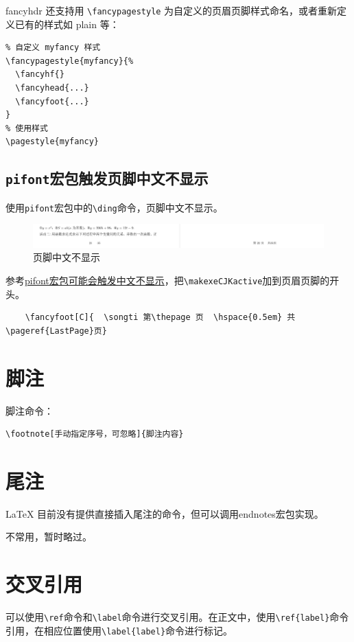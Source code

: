 {fancyhdr} 还支持用 \lstinline{\fancypagestyle} 为自定义的页眉页脚样式命名，或者重新定义已有的样式如 {plain} 等：
\begin{lstlisting}
% 自定义 myfancy 样式
\fancypagestyle{myfancy}{%
  \fancyhf{}
  \fancyhead{...}
  \fancyfoot{...}
}
% 使用样式
\pagestyle{myfancy}
\end{lstlisting}

\subsection{\lstinline{pifont}宏包触发页脚中文不显示}\label{subsec:pifontconflict}
使用\lstinline{pifont}宏包中的\lstinline{\ding}命令，页脚中文不显示。
\begin{figure}[!h]
    \centering
    \includegraphics[width=\textwidth]{figure/chap-text/pifontconflict.png}
    \caption{页脚中文不显示}
\end{figure}

参考\href{https://github.com/CTeX-org/ctex-kit/issues/688}{pifont宏包可能会触发中文不显示}，把\lstinline{\makexeCJKactive}加到页眉页脚的开头。
\begin{lstlisting}
    \fancyfoot[C]{  \songti 第\thepage 页  \hspace{0.5em} 共\pageref{LastPage}页}
\end{lstlisting}

\section{脚注}\label{sec:footnote}

脚注命令：
\begin{lstlisting}
\footnote[手动指定序号，可忽略]{脚注内容}
\end{lstlisting}



\section{尾注}\label{sec:endnote}
\LaTeX{} 目前没有提供直接插入尾注的命令，但可以调用endnotes宏包实现。

不常用，暂时略过。

\section{交叉引用}\label{sec:crossref}
可以使用\lstinline|\ref|命令和\lstinline|\label|命令进行交叉引用。在正文中，使用\lstinline|\ref{label}|命令引用，在相应位置使用\lstinline|\label{label}|命令进行标记。

